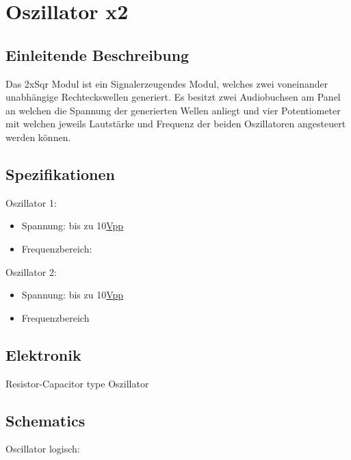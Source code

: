 \section{Oszillator x2}
\label{sec:org6af5bd5}
\subsection{Einleitende Beschreibung}
\label{sec:orgdeaa858}
Das 2xSqr Modul ist ein Signalerzeugendes Modul, welches zwei voneinander unabhängige Rechteckswellen generiert. Es besitzt zwei Audiobuchsen am Panel an welchen die Spannung der generierten Wellen anliegt und vier Potentiometer mit welchen jeweils Lautstärke und Frequenz der beiden Oszillatoren angesteuert werden können.

\subsection{Spezifikationen}
\label{sec:orge6101a8}
Oszillator 1:
\begin{itemize}
\item Spannung: bis zu 10\href{file:///home/felixp/Documents/diplomarbeit/dokumentation/content/hauptteil.org}{Vpp}
\item Frequenzbereich:
\end{itemize}

Oszillator 2:
\begin{itemize}
\item Spannung: bis zu 10\href{file:///home/felixp/Documents/diplomarbeit/dokumentation/content/hauptteil.org}{Vpp}
\item Frequenzbereich
\end{itemize}

\subsection{Elektronik}
\label{sec:org9f67528}
Resistor-Capacitor type Oszillator

\subsection{Schematics}
\label{sec:org6758415}

Oscillator logisch:

